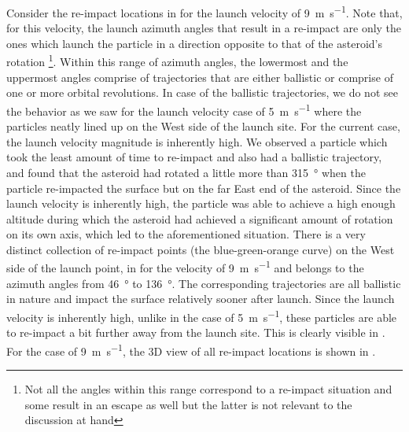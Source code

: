 \FloatBarrier
Consider the re-impact locations in  for the launch velocity of \SI{9}{\metre\per\second}. Note that, for this velocity, the launch azimuth angles that result in a re-impact are only the ones which launch the particle in a direction opposite to that of the asteroid's rotation \footnote{Not all the angles within this range correspond to a re-impact situation and some result in an escape as well but the latter is not relevant to the discussion at hand}. Within this range of azimuth angles, the lowermost and the uppermost angles comprise of trajectories that are either ballistic or comprise of one or more orbital revolutions. In case of the ballistic trajectories, we do not see the behavior as we saw for the launch velocity case of \SI{5}{\metre\per\second} where the particles neatly lined up on the West side of the launch site. For the current case, the launch velocity magnitude is inherently high. We observed a particle which took the least amount of time to re-impact and also had a ballistic trajectory, and found that the asteroid had rotated a little more than \SI{315}{\degree} when the particle re-impacted the surface but on the far East end of the asteroid. Since the launch velocity is inherently high, the particle was able to achieve a high enough altitude during which the asteroid had achieved a significant amount of rotation on its own axis, which led to the aforementioned situation.
%
\newline\newline
%
There is a very distinct collection of re-impact points (the blue-green-orange curve) on the West side of the launch point, in  for the velocity of \SI{9}{\metre\per\second} and belongs to the azimuth angles from \SI{46}{\degree} to \SI{136}{\degree}. The corresponding trajectories are all ballistic in nature and impact the surface relatively sooner after launch. Since the launch velocity is inherently high, unlike in the case of \SI{5}{\metre\per\second}, these particles are able to re-impact a bit further away from the launch site. This is clearly visible in . For the case of \SI{9}{\metre\per\second}, the 3D view of all re-impact locations is shown in .
